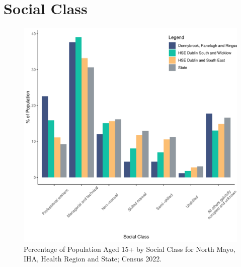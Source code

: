 \documentclass{article}
\begin{document}
\section{Social Class}\label{sect:SC}
\begin{figure}[H]
	\centering
	\includegraphics[width = 140mm]{../figures/SocialClassED.pdf}
	\caption{Percentage of Population Aged 15+ by Social Class for North Mayo, IHA, Health Region and State; Census 2022.}
	\label{fig:vbnv}
	\end{figure}
\end{document}

